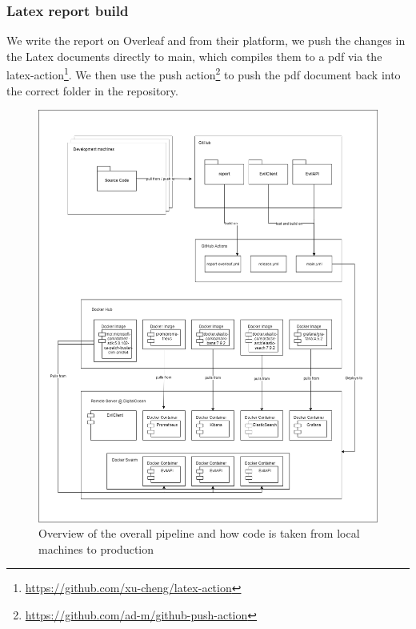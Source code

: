 \documentclass[report/main.tex]{subfiles}
\begin{document}
            \subsubsection{Latex report build}
        
                We write the report on Overleaf and from their platform, we push the changes in the Latex documents directly to main, which compiles them to a pdf via the latex-action\footnote{\hyperlink{latex compiler action}{https://github.com/xu-cheng/latex-action}}. We then use the push action\footnote{\hyperlink{push action}{https://github.com/ad-m/github-push-action}} to push the pdf document back into the correct folder in the repository. 
            
            \newpage
        
                \begin{figure}[H]
                    \centering
                        \includegraphics[width=\textwidth]{report/images/EvilTwitter-workflow-final.png}
                        \caption{Overview of the overall pipeline and how code is taken from local machines to production}
                    \label{fig:overall_workflow}
                \end{figure}
                
\end{document}
